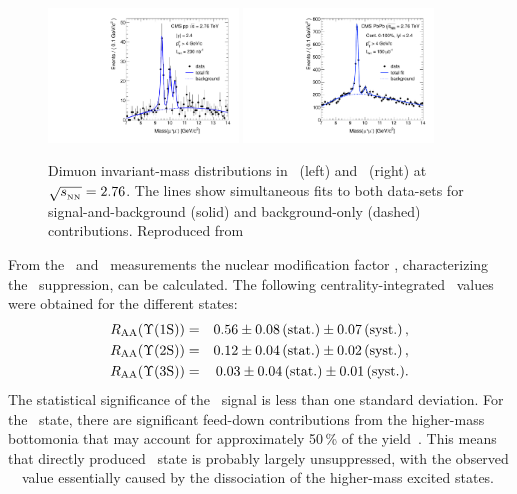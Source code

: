 \begin{figure}
\begin{center}
    \includegraphics[width=0.45\textwidth]{quarkoniafigs/ppFitPt4Erf}
    \includegraphics[width=0.45\textwidth]{quarkoniafigs/hiFitPt4Erf}
    \label{fig:KS:mass}
    \caption{Dimuon invariant-mass distributions in \PbPb\ (left) and \pp\ (right)
at $\sqrt{s_{_{\rm NN}}} = 2.76$\TeV. The lines show simultaneous fits to both
data-sets for signal-and-background (solid) and background-only (dashed) contributions.
Reproduced from~\cite{Chatrchyan:2012lxa}}
\end{center}
\end{figure}

From the \PbPb\ and \pp\ measurements the nuclear modification factor \Raa, characterizing the \PgU\ suppression,
can be calculated. The following centrality-integrated \Raa\ values were obtained for the different \PgUn states:
\begin{eqnarray}
R_\mathrm{AA} (\Upsilon\mathrm{(1S)}) &=& 0.56 \pm 0.08\,\mbox{(stat.)} \pm 0.07\,\mbox{(syst.)} \,, \nonumber \\
R_\mathrm{AA} (\Upsilon\mathrm{(2S)}) &=& 0.12 \pm 0.04\,\mbox{(stat.)} \pm 0.02\,\mbox{(syst.)} \,,  \\
R_\mathrm{AA} (\Upsilon\mathrm{(3S)}) &=& 0.03 \pm 0.04\,\mbox{(stat.)} \pm 0.01\,\mbox{(syst.)} .  \nonumber
\end{eqnarray}
The statistical significance of the \PgUc\ signal is less than one standard deviation.
For the \PgUa\ state, there are significant feed-down contributions from the higher-mass bottomonia that may account for approximately 50\,\% of the yield~\cite{Affolder:1999wm, Aaij:2012se}.
This means that directly produced \PgUa\ state is probably largely unsuppressed, with
the observed \PgUa\ \Raa\ value essentially caused by the dissociation of the higher-mass excited states.


